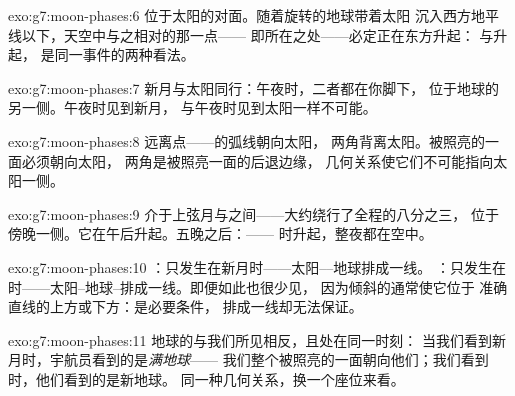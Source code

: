 \begin{solution}{exo:g7:moon-phases:6}
位于太阳的对面。随着旋转的地球带着太阳
沉入西方地平线以下，天空中与之相对的那一点——
即所在之处——必定正在东方升起：
与升起，
是同一事件的两种看法。
\end{solution}

\begin{solution}{exo:g7:moon-phases:7}
新月与太阳同行：午夜时，二者都在你脚下，
位于地球的另一侧。午夜时见到新月，
与午夜时见到太阳一样不可能。
\end{solution}

\begin{solution}{exo:g7:moon-phases:8}
远离点——的弧线朝向太阳，
两角背离太阳。被照亮的一面必须朝向太阳，
两角是被照亮一面的后退边缘，
几何关系使它们不可能指向太阳一侧。
\end{solution}

\begin{solution}{exo:g7:moon-phases:9}
介于上弦月与之间——大约绕行了全程的八分之三，
位于傍晚一侧。它在午后升起。五晚之后：——
时升起，整夜都在空中。
\end{solution}

\begin{solution}{exo:g7:moon-phases:10}
：只发生在新月时——太阳––地球排成一线。
：只发生在时——太阳–地球–排成一线。即便如此也很少见，
因为倾斜的通常使它位于
准确直线的上方或下方：是必要条件，
排成一线却无法保证。
\end{solution}

\begin{solution}{exo:g7:moon-phases:11}
地球的与我们所见相反，且处在同一时刻：
当我们看到新月时，宇航员看到的是\emph{满地球}——
我们整个被照亮的一面朝向他们；我们看到时，他们看到的是新地球。
同一种几何关系，换一个座位来看。
\end{solution}

